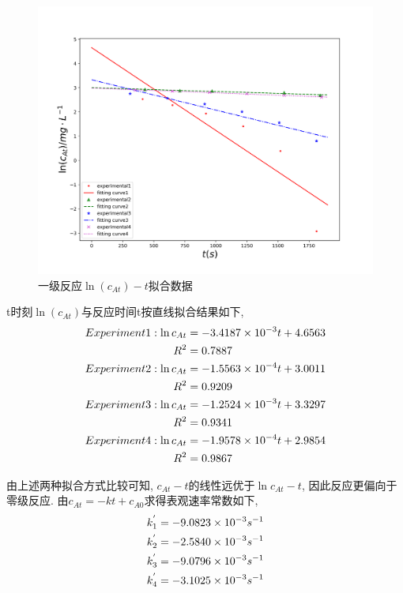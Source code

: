 \documentclass[a4paper]{article}
\begin{document}
\begin{figure}[H]
	\centering
	\includegraphics[width = 0.5\paperwidth]{fig/fitting2.png}
	\caption{一级反应$\ln(c_{At})-t$拟合数据}
\end{figure}
t时刻$\ln(c_{At})$与反应时间t按直线拟合结果如下,
\begin{equation}
	\centering
	\begin{aligned}
		Experiment1: \ln c_{At} &= -3.4187\times 10^{-3}t + 4.6563\\
		R^{2} &= 0.7887\\
		Experiment2: \ln c_{At} &= -1.5563\times 10^{-4}t + 3.0011\\
		R^{2} &= 0.9209\\
		Experiment3: \ln c_{At} &= -1.2524\times 10^{-3}t + 3.3297\\
		R^{2} &= 0.9341\\
		Experiment4: \ln c_{At} &= -1.9578\times 10^{-4}t + 2.9854\\
		R^{2} &= 0.9867\\
	\end{aligned}
\end{equation}
\par
由上述两种拟合方式比较可知, $c_{At} - t$的线性远优于$\ln c_{At} - t$, 
因此反应更偏向于零级反应. 由$c_{At} = -kt + c_{A0}$求得表观速率常数如下, 
\begin{equation}
	\centering
	\begin{aligned}
		k_{1}^{'} &= -9.0823\times 10^{-3} s^{-1}\\
		k_{2}^{'} &= -2.5840\times 10^{-3} s^{-1}\\
		k_{3}^{'} &= -9.0796\times 10^{-3} s^{-1}\\
		k_{4}^{'} &= -3.1025\times 10^{-3} s^{-1}\\
	\end{aligned}
\end{equation}
\newpage
\end{document}
